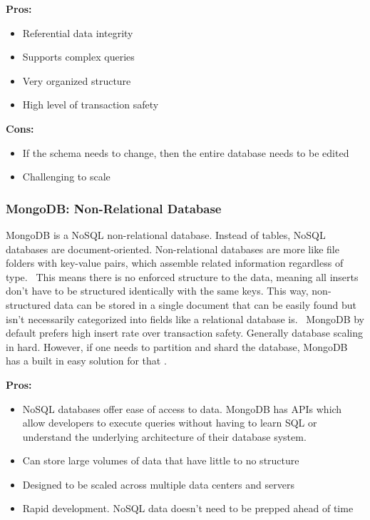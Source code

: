 \documentclass[onecolumn, draftclsnofoot,10pt, compsoc]{IEEEtran}
\begin{document}
	\textbf{Pros:}
	\begin{itemize}
		\item{
			Referential data integrity}
		\item{
			Supports complex queries}
		\item{
			Very organized structure}
		\item{
			High level of transaction safety}
	\end{itemize}
	\textbf{Cons:}
	\begin{itemize}
		\item{
			If the schema needs to change, then the entire database needs to be edited \cite{SQLvsNoSQLupwork} }
		\item{
			Challenging to scale}

	\end{itemize}

	\subsubsection{MongoDB: Non-Relational Database}
	MongoDB is a NoSQL non-relational database.
	Instead of tables, NoSQL databases are document-oriented.
	Non-relational databases are more like file folders with key-value pairs, which assemble related information regardless of type. 
	This means there is no enforced structure to the data, meaning all inserts don't have to be structured identically with the same keys.
	This way, non-structured data can be stored in a single document that can be easily found but isn't necessarily categorized into fields like a relational database is. 
	MongoDB by default prefers high insert rate over transaction safety.
	Generally database scaling in hard.
	However, if one needs to partition and shard the database, MongoDB has a built in easy solution for that \cite{SQLvsNoSQLupwork}.

	\textbf{Pros:}
	\begin{itemize}
		\item{
			NoSQL databases offer ease of access to data.
			MongoDB has APIs which allow developers to execute queries without having to learn SQL or understand the underlying architecture of their database system.}
		\item{
			Can store large volumes of data that have little to no structure} 
		\item{
			Designed to be scaled across multiple data centers and servers}
		\item{
			Rapid development. NoSQL data doesn’t need to be prepped ahead of time \cite{SQLvsNoSQLupwork}}
	\end{itemize}
\end{document}
